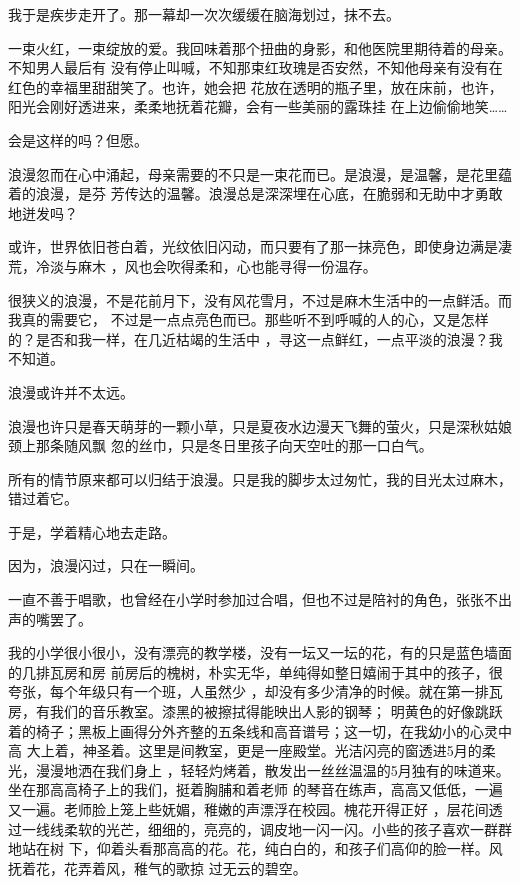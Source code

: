 \documentclass[12pt,a4paper]{article}
\begin{document}
		我于是疾步走开了。那一幕却一次次缓缓在脑海划过，抹不去。

		一束火红，一束绽放的爱。我回味着那个扭曲的身影，和他医院里期待着的母亲。不知男人最后有
	没有停止叫喊，不知那束红玫瑰是否安然，不知他母亲有没有在红色的幸福里甜甜笑了。也许，她会把
	花放在透明的瓶子里，放在床前，也许，阳光会刚好透进来，柔柔地抚着花瓣，会有一些美丽的露珠挂
	在上边偷偷地笑……

		会是这样的吗？但愿。

		浪漫忽而在心中涌起，母亲需要的不只是一束花而已。是浪漫，是温馨，是花里蕴着的浪漫，是芬
	芳传达的温馨。浪漫总是深深埋在心底，在脆弱和无助中才勇敢地迸发吗？

		或许，世界依旧苍白着，光纹依旧闪动，而只要有了那一抹亮色，即使身边满是凄荒，冷淡与麻木
	，风也会吹得柔和，心也能寻得一份温存。

		很狭义的浪漫，不是花前月下，没有风花雪月，不过是麻木生活中的一点鲜活。而我真的需要它，
	不过是一点点亮色而已。那些听不到呼喊的人的心，又是怎样的？是否和我一样，在几近枯竭的生活中
	，寻这一点鲜红，一点平淡的浪漫？我不知道。

		浪漫或许并不太远。

		浪漫也许只是春天萌芽的一颗小草，只是夏夜水边漫天飞舞的萤火，只是深秋姑娘颈上那条随风飘
	忽的丝巾，只是冬日里孩子向天空吐的那一口白气。

		所有的情节原来都可以归结于浪漫。只是我的脚步太过匆忙，我的目光太过麻木，错过着它。

		于是，学着精心地去走路。

		因为，浪漫闪过，只在一瞬间。

	\endwriting



		一直不善于唱歌，也曾经在小学时参加过合唱，但也不过是陪衬的角色，张张不出声的嘴罢了。

		我的小学很小很小，没有漂亮的教学楼，没有一坛又一坛的花，有的只是蓝色墙面的几排瓦房和房
	前房后的槐树，朴实无华，单纯得如整日嬉闹于其中的孩子，很夸张，每个年级只有一个班，人虽然少
	，却没有多少清净的时候。就在第一排瓦房，有我们的音乐教室。漆黑的被擦拭得能映出人影的钢琴；
	明黄色的好像跳跃着的椅子；黑板上画得分外齐整的五条线和高音谱号；这一切，在我幼小的心灵中高
	大上着，神圣着。这里是间教室，更是一座殿堂。光洁闪亮的窗透进5月的柔光，漫漫地洒在我们身上
	，轻轻灼烤着，散发出一丝丝温温的5月独有的味道来。坐在那高高椅子上的我们，挺着胸脯和着老师
	的琴音在练声，高高又低低，一遍又一遍。老师脸上笼上些妩媚，稚嫩的声漂浮在校园。槐花开得正好
	，层花间透过一线线柔软的光芒，细细的，亮亮的，调皮地一闪一闪。小些的孩子喜欢一群群地站在树
	下，仰着头看那高高的花。花，纯白白的，和孩子们高仰的脸一样。风抚着花，花弄着风，稚气的歌掠
	过无云的碧空。
\end{document}
